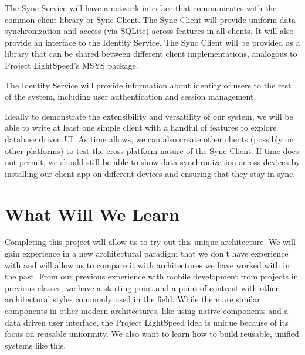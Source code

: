 \documentclass[12pt]{article}
\begin{document}
    The Sync Service will have a network interface that communicates with the common client library or Sync Client.
    The Sync Client will provide uniform data synchronization and access (via SQLite) across features in all clients.
    It will also provide an interface to the Identity Service.
        The Sync Client will be provided as a library that can be shared between different client implementations, analogous to Project LightSpeed's MSYS package.

    The Identity Service will provide information about identity of users to the rest of the system, including user authentication and session management.

    Ideally to demonstrate the extensibility and versatility of our system, we will be able to write at least one simple client with a handful of features to explore database driven UI.
    As time allows, we can also create other clients (possibly on other platforms) to test the cross-platform nature of the Sync Client.
    If time does not permit, we should still be able to show data synchronization across devices by installing our client app on different devices and ensuring that they stay in sync.


    \section{What Will We Learn}
    Completing this project will allow us to try out this unique architecture.
    We will gain experience in a new architectural paradigm that we don’t have experience with and will allow us to compare it with architectures we have worked with in the past.
    From our previous experience with mobile development from projects in previous classes, we have a starting point and a point of contrast with other architectural styles commonly used in the field.
    While there are similar components in other modern architectures, like using native components and a data driven user interface, the Project LightSpeed idea is unique because of its focus on reusable uniformity.
    We also want to learn how to build reusable, unified systems like this.
\end{document}
